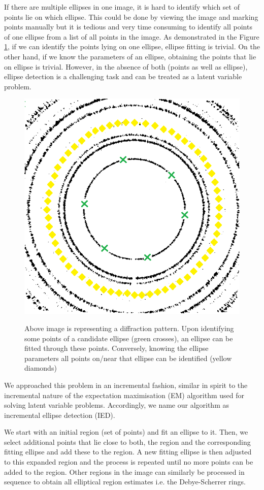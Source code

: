 \documentclass[preprint]{iucr}              %
\newcommand\dsrs{Debye-Scherrer rings}
\begin{document}
If there are multiple ellipses in one image, it is hard to identify which set of points lie on which ellipse. This could be done by viewing the image and marking points manually but it is tedious and very time consuming to identify all points of one ellipse from a list of all points in the image. As demonstrated in the Figure \ref{fig:chickenandegg}, if we can identify the points lying on one ellipse, ellipse fitting is trivial. On the other hand, if we know the parameters of an ellipse, obtaining the points that lie on ellipse is trivial. However, in the absence of both (points as well as ellipse), ellipse detection is a challenging task and can be treated as a latent variable problem. 

\begin{figure}
\includegraphics[width=.45\linewidth]{Figures/max1_points_on_ellipse_new.png}
\label{fig:chickenandegg}
\caption{Above image is representing a diffraction pattern. Upon identifying some points of a candidate ellipse (green crosses), an ellipse can be fitted through these points. Conversely, knowing the ellipse parameters all points on/near that ellipse can be identified (yellow diamonds)}
\end{figure}

We approached this problem in an incremental fashion, similar in spirit to the incremental nature of the expectation maximisation (EM) algorithm \cite{dempster1977maximum} used for solving latent variable problems. Accordingly, we name our algorithm as incremental ellipse detection (IED).

We start with an initial region (set of points) and fit an ellipse to it. Then, we select additional points that lie close to both, the region and the corresponding fitting ellipse and add these to the region. A new fitting ellipse is then adjusted to this expanded region and the process is repeated until no more points can be added to the region. Other regions in the image can similarly be processed in sequence to obtain all elliptical region estimates i.e. the {\dsrs}. 
\end{document}
